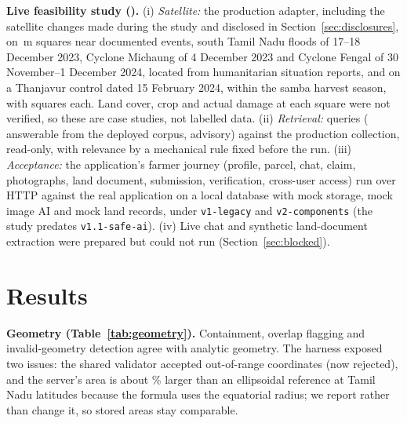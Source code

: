 \documentclass{ieeeaccess}
\begin{document}
\textbf{Live feasibility study (\StudyDate{}).} (i) \emph{Satellite:} the production adapter, including the satellite changes made during the study and disclosed in Section~\ref{sec:disclosures}, on \SatSquareSideMetres\,m squares near \SatEventCountWord{} documented events, south Tamil Nadu floods of 17--18 December 2023, Cyclone Michaung of 4 December 2023 and Cyclone Fengal of 30 November--1 December 2024, located from humanitarian situation reports, and on a Thanjavur control dated 15 February 2024, within the samba harvest season, with \SatSquaresPerEventWord{} squares each. Land cover, crop and actual damage at each square were not verified, so these are case studies, not labelled data. (ii) \emph{Retrieval:} \RagQueries{} queries (\RagAnswerableQueries{} answerable from the deployed corpus, \RagAdvisoryQueries{} advisory) against the production collection, read-only, with relevance by a mechanical rule fixed before the run. (iii) \emph{Acceptance:} the application's farmer journey (profile, parcel, chat, claim, photographs, land document, submission, verification, cross-user access) run over HTTP against the real application on a local database with mock storage, mock image AI and mock land records, under \texttt{v1-legacy} and \texttt{v2-components} (the study predates \texttt{v1.1-safe-ai}). (iv) Live chat and synthetic land-document extraction were prepared but could not run (Section~\ref{sec:blocked}).

\section{Results}


\textbf{Geometry (Table~\ref{tab:geometry}).} Containment, overlap flagging and invalid-geometry detection agree with analytic geometry. The harness exposed two issues: the shared validator accepted out-of-range coordinates (now rejected), and the server's area is about \GeometryAreaBiasPercent\% larger than an ellipsoidal reference at Tamil Nadu latitudes because the formula uses the equatorial radius; we report rather than change it, so stored areas stay comparable.
\end{document}
